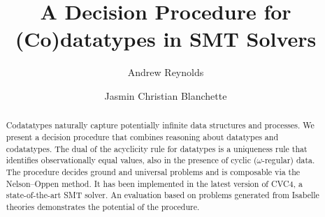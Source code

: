 \newcommand\Data{\Types_{\mathrm{dt}}}
\newcommand\Codata{\Types_{\mathrm{codt}}}
\newcommand\Nondata{\Types_{\mathrm{ord}}}

\newcommand\Ctr{\Funcs_{\mathrm{ctr}}}
\newcommand\Sel{\Funcs_{\mathrm{sel}}}

\newcommand\vvthinspace{\kern+0.041667em}
\newcommand\vthinspace{\kern+0.083333em}
\newcommand\negvthinspace{\kern-0.083333em}

\usepackage[
   a4paper,
   pdftex,
   pdftitle={A Decision Procedure for (Co)datatypes in SMT Solvers},
   pdfauthor={Andrew Reynolds and Jasmin Christian Blanchette},
   pdfkeywords={},
   pdfborder={0 0 0},
   draft=false,
   bookmarksnumbered,
   bookmarks,
   bookmarksdepth=2,
   bookmarksopenlevel=2,
   bookmarksopen]{hyperref}


\global\def\figurename{Figure}
\global\def\figuresname{Figures}


\makeatletter
\ps@myheadings
\makeatother







\title{A Decision Procedure for (Co)datatypes in SMT Solvers}

\author {Andrew Reynolds \and Jasmin Christian Blanchette}

\maketitle

\begin{abstract}
Codatatypes naturally capture potentially infinite data structures and
processes. We present a decision procedure that combines reasoning about
datatypes and codatatypes. The dual of the acyclicity rule for datatypes is a
uniqueness rule that identifies observationally equal values, also in the presence of cyclic
($\omega$-regular) data. The procedure decides ground and universal
problems and is composable via the Nelson--Oppen method. It has been
implemented in the latest version of CVC4, a state-of-the-art SMT solver. An
evaluation based on problems generated from Isabelle theories demonstrates the
potential of the procedure.
\end{abstract}

